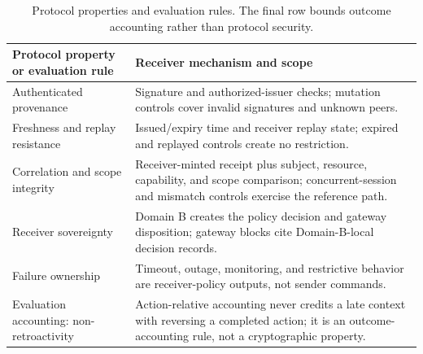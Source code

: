 \begin{table}[t]
\centering
\scriptsize
\begin{tabular}{p{}p{}}
\toprule
Protocol property or evaluation rule & Receiver mechanism and scope \\
\midrule
Authenticated provenance & Signature and authorized-issuer checks; mutation controls cover invalid signatures and unknown peers. \\
Freshness and replay resistance & Issued/expiry time and receiver replay state; expired and replayed controls create no restriction. \\
Correlation and scope integrity & Receiver-minted receipt plus subject, resource, capability, and scope comparison; concurrent-session and mismatch controls exercise the reference path. \\
Receiver sovereignty & Domain B creates the policy decision and gateway disposition; gateway blocks cite Domain-B-local decision records. \\
Failure ownership & Timeout, outage, monitoring, and restrictive behavior are receiver-policy outputs, not sender commands. \\
\midrule
Evaluation accounting: non-retroactivity & Action-relative accounting never credits a late context with reversing a completed action; it is an outcome-accounting rule, not a cryptographic property. \\
\bottomrule
\end{tabular}
\caption{Protocol properties and evaluation rules. The final row bounds outcome accounting rather than protocol security.}
\label{tab:security-goals}
\end{table}
